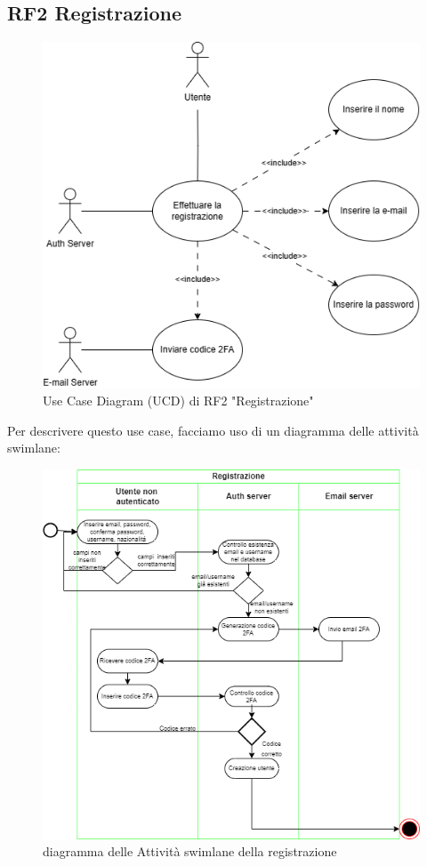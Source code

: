 \documentclass{report}
\begin{document}
\subsection*{RF2 Registrazione}
\begin{figure}[H]
	\centering\includegraphics[width=1\textwidth]{images/UCD/RF2_registrazione_UCD.png}
	Use Case Diagram (UCD) di RF2 "Registrazione"
\end{figure}
Per descrivere questo use case, facciamo uso di un diagramma delle attività swimlane:
\begin{figure}[H]
	\centering\includegraphics[width=1\textwidth]{images/Register_swimlane.drawio.png}
	diagramma delle Attività swimlane della registrazione
\end{figure}
\end{document}
